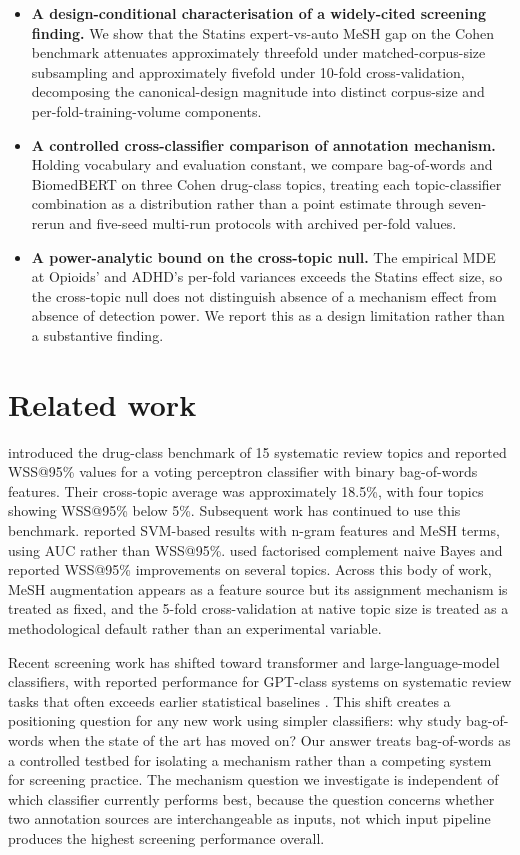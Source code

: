 \documentclass{article}
\begin{document}
\begin{itemize}
\item \textbf{A design-conditional characterisation of a widely-cited screening finding.} We show that the Statins expert-vs-auto MeSH gap on the Cohen benchmark attenuates approximately threefold under matched-corpus-size subsampling and approximately fivefold under 10-fold cross-validation, decomposing the canonical-design magnitude into distinct corpus-size and per-fold-training-volume components.
\item \textbf{A controlled cross-classifier comparison of annotation mechanism.} Holding vocabulary and evaluation constant, we compare bag-of-words and BiomedBERT on three Cohen drug-class topics, treating each topic-classifier combination as a distribution rather than a point estimate through seven-rerun and five-seed multi-run protocols with archived per-fold values.
\item \textbf{A power-analytic bound on the cross-topic null.} The empirical MDE at Opioids' and ADHD's per-fold variances exceeds the Statins effect size, so the cross-topic null does not distinguish absence of a mechanism effect from absence of detection power. We report this as a design limitation rather than a substantive finding.
\end{itemize}

\section{Related work}

 introduced the drug-class benchmark of 15 systematic review topics and reported WSS@95\% values for a voting perceptron classifier with binary bag-of-words features. Their cross-topic average was approximately 18.5\%, with four topics showing WSS@95\% below 5\%. Subsequent work has continued to use this benchmark.  reported SVM-based results with n-gram features and MeSH terms, using AUC rather than WSS@95\%.  used factorised complement naive Bayes and reported WSS@95\% improvements on several topics. Across this body of work, MeSH augmentation appears as a feature source but its assignment mechanism is treated as fixed, and the 5-fold cross-validation at native topic size is treated as a methodological default rather than an experimental variable.

Recent screening work has shifted toward transformer and large-language-model classifiers, with reported performance for GPT-class systems on systematic review tasks that often exceeds earlier statistical baselines \cite{guo2024llm,alshami2023chatgpt,wang2024boolean}. This shift creates a positioning question for any new work using simpler classifiers: why study bag-of-words when the state of the art has moved on? Our answer treats bag-of-words as a controlled testbed for isolating a mechanism rather than a competing system for screening practice. The mechanism question we investigate is independent of which classifier currently performs best, because the question concerns whether two annotation sources are interchangeable as inputs, not which input pipeline produces the highest screening performance overall.
\end{document}

